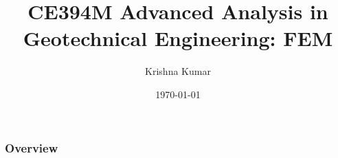 \documentclass[notes]{beamer}
\title[CE394M: Intro to FEM]{CE394M Advanced Analysis in Geotechnical Engineering: FEM}
\author{Krishna Kumar} %
\institute[UT Austin] %
{
University of Texas at Austin \\
\medskip
\textit{
  \url{krishnak@utexas.edu}} %
}
\date{\today} %
\begin{document}
\begin{frame}
\titlepage %
\end{frame}

\begin{frame}
 \frametitle{Overview}
 \tableofcontents
\end{frame}


\end{document}
